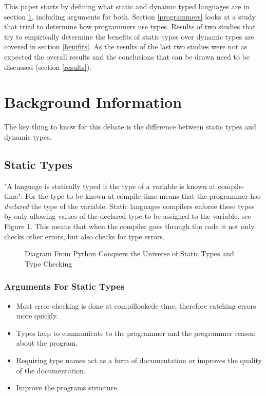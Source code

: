\documentclass{sig-alternate}
\begin{document}
This paper starts by defining what static and dynamic typed languages are in section \ref{types}, including arguments for both. Section \ref{programmers} looks at a study that tried to determine how programmers use types. Results of two studies that try to empirically determine the benefits of static types over dynamic types are covered in section \ref{benifits}. As the results of the last two studies were not as expected the overall results and the conclusions that can be drawn need to be discussed (section \ref{results}).

\section{Background Information}\label{types}
The key thing to know for this debate is the difference between static types and dynamic types. 

\subsection{Static Types}\label{static}
"A language is statically typed if the type of a variable is known at compile-time"\cite{NomeN2009}. For the type to be known at compile-time means that the programmer has \emph{declared} the type of the variable. Static languages compilers enforce these types by only allowing values of the declared type to be assigned to the variable. see Figure 1. This means that when the compiler goes through the code it not only checks other errors, but also checks for type errors.
 
\begin{figure}
\centering
{}
\caption{Diagram From Python Conquers the Universe of Static Types and Type Checking}
\end{figure}
\subsubsection{Arguments For Static Types}\label{arguments}
\begin{itemize}
\item Most error checking is done at compillookede-time, therefore catching errors more quickly.
\item Types help to communicate to the programmer and the programmer reason about the program.
\item Requiring type names act as a form of documentation or improves the quality of the documentation.
\item Improve the programs structure.
\end{itemize}
\end{document}
